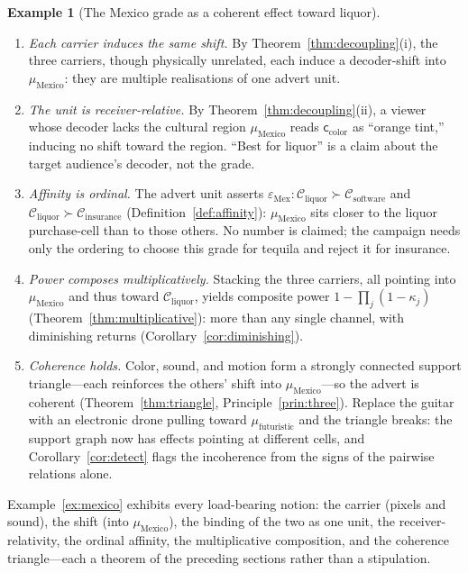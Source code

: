 \documentclass[twocolumn,11pt,a4paper]{article}
\theoremstyle{adv}
\theoremstyle{definition}
\newtheorem{example}[theorem]{Example}
\theoremstyle{remark}
\newcommand{\Cell}{\mathcal{C}}        %
\newcommand{\Eff}{\varepsilon}        %
\newcommand{\Carrier}{\kappa}         %
\renewcommand{\Carrier}{\mathsf{c}}
\newcommand{\pot}{\kappa}             %
\begin{document}
\begin{example}[The Mexico grade as a coherent effect toward liquor]
\begin{enumerate}[label=(\arabic*),leftmargin=1.6em,itemsep=2pt]
\item \emph{Each carrier induces the same shift.} By
  Theorem~\ref{thm:decoupling}(i), the three carriers, though physically
  unrelated, each induce a decoder-shift into $\mu_{\text{Mexico}}$: they
  are multiple realisations of one advert unit.
\item \emph{The unit is receiver-relative.} By
  Theorem~\ref{thm:decoupling}(ii), a viewer whose decoder lacks the
  cultural region $\mu_{\text{Mexico}}$ reads $\Carrier_{\text{color}}$ as
  ``orange tint,'' inducing no shift toward the region. ``Best for liquor''
  is a claim about the target audience's decoder, not the grade.
\item \emph{Affinity is ordinal.} The advert unit asserts
  $\Eff_{\text{Mex}}:\Cell_{\text{liquor}}\succ\Cell_{\text{software}}$ and
  $\Cell_{\text{liquor}}\succ\Cell_{\text{insurance}}$
  (Definition~\ref{def:affinity}): $\mu_{\text{Mexico}}$ sits closer to the
  liquor purchase-cell than to those others. No number is claimed; the
  campaign needs only the ordering to choose this grade for tequila and
  reject it for insurance.
\item \emph{Power composes multiplicatively.} Stacking the three carriers,
  all pointing into $\mu_{\text{Mexico}}$ and thus toward
  $\Cell_{\text{liquor}}$, yields composite power
  $1-\prod_{j}(1-\pot_j)$ (Theorem~\ref{thm:multiplicative}): more than any
  single channel, with diminishing returns
  (Corollary~\ref{cor:diminishing}).
\item \emph{Coherence holds.} Color, sound, and motion form a strongly
  connected support triangle---each reinforces the others' shift into
  $\mu_{\text{Mexico}}$---so the advert is coherent
  (Theorem~\ref{thm:triangle}, Principle~\ref{prin:three}). Replace the
  guitar with an electronic drone pulling toward
  $\mu_{\text{futuristic}}$ and the triangle breaks: the support graph now
  has effects pointing at different cells, and
  Corollary~\ref{cor:detect} flags the incoherence from the signs of the
  pairwise relations alone.
\end{enumerate}
\end{example}

Example~\ref{ex:mexico} exhibits every load-bearing notion: the carrier
(pixels and sound), the shift (into $\mu_{\text{Mexico}}$), the binding of
the two as one unit, the receiver-relativity, the ordinal affinity, the
multiplicative composition, and the coherence triangle---each a theorem of
the preceding sections rather than a stipulation.
\end{document}
